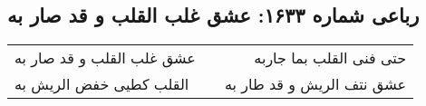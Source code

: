 \begin{center}
\section*{رباعی شماره ۱۶۳۳: عشق غلب القلب و قد صار به}
\label{sec:1633}
\begin{longtable}{l p{0.5cm} r}
عشق غلب القلب و قد صار به
&&
حتی فنی القلب بما جاربه
\\
القلب کطیی خفض الریش به
&&
عشق نتف الریش و قد طار به
\\
\end{longtable}
\end{center}
